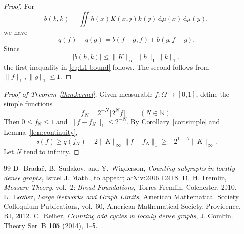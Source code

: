 \documentclass[10pt,a4paper]{amsart}
\newcommand{\N}{\mathbb N}
\newcommand{\dd}{\,\mathrm d}
\newcommand{\norminf}[1]{\lVert #1\rVert_\infty}
\newcommand{\normone}[1]{\lVert #1\rVert_1}
\begin{document}
\begin{proof}
For
\[
  b(h,k)=\iint h(x)K(x,y)k(y)\dd\mu(x)\dd\mu(y),
\]
we have
\[
  q(f)-q(g)=b(f-g,f)+b(g,f-g).
\]
Since
\[
  |b(h,k)|\leq\norminf{K}\normone{h}\normone{k},
\]
the first inequality in \eqref{eq:L1-bound} follows. The second follows from
$\normone{f},\normone{g}\leq1$.
\end{proof}


\begin{proof}[Proof of Theorem~\ref{thm:kernel}]
Given measurable $f\colon\Omega\to[0,1]$, define the simple functions
\[
  f_N=2^{-N}\lfloor2^Nf\rfloor\qquad(N\in\N).
\]
Then $0\leq f_N\leq1$ and $\normone{f-f_N}\leq2^{-N}$. By
Corollary~\ref{cor:simple} and Lemma~\ref{lem:continuity},
\[
  q(f)\geq q(f_N)-2\norminf{K}\normone{f-f_N}
       \geq-2^{1-N}\norminf{K}.
\]
Let $N$ tend to infinity.
\end{proof}

\begin{thebibliography}{99}
 D.~Brada\v{c}, B.~Sudakov, and Y.~Wigderson, \emph{Counting subgraphs in locally dense graphs}, Israel J. Math., to appear; arXiv:2406.12418.
 D.~H. Fremlin, \emph{Measure Theory}, vol.~2: \emph{Broad Foundations}, Torres Fremlin, Colchester, 2010.
 L.~Lov\'asz, \emph{Large Networks and Graph Limits}, American Mathematical Society Colloquium Publications, vol.~60, American Mathematical Society, Providence, RI, 2012.
 C.~Reiher, \emph{Counting odd cycles in locally dense graphs}, J. Combin. Theory Ser. B \textbf{105} (2014), 1--5.
\end{thebibliography}
\end{document}
